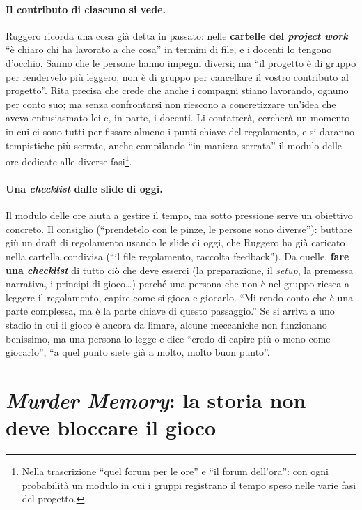 \paragraph{Il contributo di ciascuno si vede.} Ruggero ricorda una cosa già detta in
passato: nelle \textbf{cartelle del \emph{project work}} ``è chiaro chi ha lavorato a che
cosa'' in termini di file, e i docenti lo tengono d'occhio. Sanno che le persone hanno
impegni diversi; ma ``il progetto è di gruppo per rendervelo più leggero, non è di gruppo
per cancellare il vostro contributo al progetto''. Rita precisa che crede che anche i
compagni stiano lavorando, ognuno per conto suo; ma senza confrontarsi non riescono a
concretizzare un'idea che aveva entusiasmato lei e, in parte, i docenti. Li contatterà,
cercherà un momento in cui ci sono tutti per fissare almeno i punti chiave del
regolamento, e si daranno tempistiche più serrate, anche compilando ``in maniera serrata''
il modulo delle ore dedicate alle diverse fasi\footnote{Nella trascrizione ``quel forum
per le ore'' e ``il forum dell'ora'': con ogni probabilità un modulo in cui i gruppi
registrano il tempo speso nelle varie fasi del progetto.}.

\paragraph{Una \emph{checklist} dalle slide di oggi.} Il modulo delle ore aiuta a gestire
il tempo, ma sotto pressione serve un obiettivo concreto. Il consiglio (``prendetelo con
le pinze, le persone sono diverse''): buttare giù un draft di regolamento usando le slide
di oggi, che Ruggero ha già caricato nella cartella condivisa (``il file regolamento,
raccolta feedback''). Da quelle, \textbf{fare una \emph{checklist}} di tutto ciò che deve
esserci (la preparazione, il \emph{setup}, la premessa narrativa, i principi di
gioco\ldots) perché una persona che non è nel gruppo riesca a leggere il regolamento,
capire come si gioca e giocarlo. ``Mi rendo conto che è una parte complessa, ma è la
parte chiave di questo passaggio.'' Se si arriva a uno stadio in cui il gioco è ancora da
limare, alcune meccaniche non funzionano benissimo, ma una persona lo legge e dice ``credo
di capire più o meno come giocarlo'', ``a quel punto siete già a molto, molto buon
punto''.

\section{\emph{Murder Memory}: la storia non deve bloccare il gioco}
\label{a12:sec:murder}


